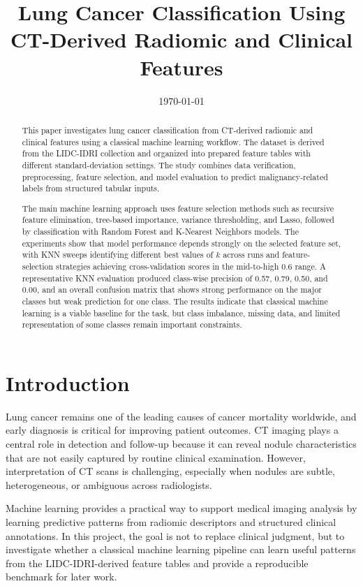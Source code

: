 \documentclass[11pt,a4paper]{article}
\title{Lung Cancer Classification Using CT-Derived Radiomic and Clinical Features}
\author{}
\date{\today}
\begin{document}
\maketitle

\begin{abstract}
This paper investigates lung cancer classification from CT-derived radiomic and clinical features using a classical machine learning workflow. The dataset is derived from the LIDC-IDRI collection and organized into prepared feature tables with different standard-deviation settings. The study combines data verification, preprocessing, feature selection, and model evaluation to predict malignancy-related labels from structured tabular inputs.

The main machine learning approach uses feature selection methods such as recursive feature elimination, tree-based importance, variance thresholding, and Lasso, followed by classification with Random Forest and K-Nearest Neighbors models. The experiments show that model performance depends strongly on the selected feature set, with KNN sweeps identifying different best values of $k$ across runs and feature-selection strategies achieving cross-validation scores in the mid-to-high 0.6 range. A representative KNN evaluation produced class-wise precision of 0.57, 0.79, 0.50, and 0.00, and an overall confusion matrix that shows strong performance on the major classes but weak prediction for one class. The results indicate that classical machine learning is a viable baseline for the task, but class imbalance, missing data, and limited representation of some classes remain important constraints.
\end{abstract}

\section{Introduction}


Lung cancer remains one of the leading causes of cancer mortality worldwide, and early diagnosis is critical for improving patient outcomes. CT imaging plays a central role in detection and follow-up because it can reveal nodule characteristics that are not easily captured by routine clinical examination. However, interpretation of CT scans is challenging, especially when nodules are subtle, heterogeneous, or ambiguous across radiologists.

Machine learning provides a practical way to support medical imaging analysis by learning predictive patterns from radiomic descriptors and structured clinical annotations. In this project, the goal is not to replace clinical judgment, but to investigate whether a classical machine learning pipeline can learn useful patterns from the LIDC-IDRI-derived feature tables and provide a reproducible benchmark for later work.
\end{document}
